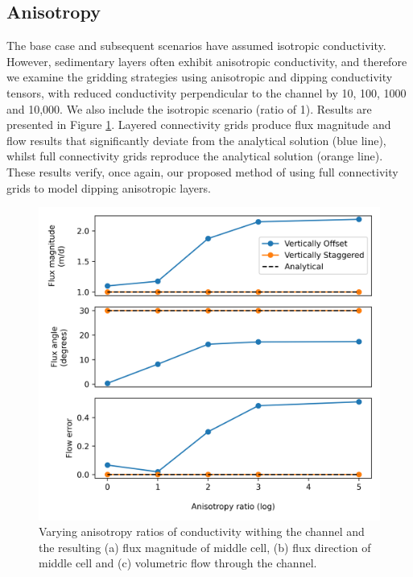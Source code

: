 \documentclass{article}
\begin{document}
\subsection{Anisotropy}

The base case and subsequent scenarios have assumed isotropic conductivity. However, sedimentary layers often exhibit anisotropic conductivity, and therefore we examine the gridding strategies using anisotropic and dipping conductivity tensors, with reduced conductivity perpendicular to the channel by 10, 100, 1000 and 10,000. We also include the isotropic scenario (ratio of 1). Results are presented in Figure \ref{fig:fig5}. 
Layered connectivity grids produce flux magnitude and flow results that significantly deviate from the analytical solution (blue line), whilst full connectivity grids reproduce the analytical solution (orange line). These results verify, once again, our proposed method of using full connectivity grids to model dipping anisotropic layers.


\begin{figure}
	\begin{center}
	\includegraphics[scale=0.9]{../figures/fig5paper.png}
	\caption{Varying anisotropy ratios of conductivity withing the channel and the resulting (a) flux magnitude of middle cell, (b) flux direction of middle cell and (c) volumetric flow through the channel. }
	\label{fig:fig5}
	\end{center}
\end{figure}
\end{document}
